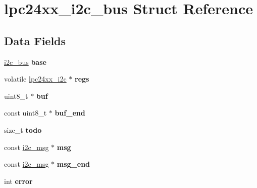 \hypertarget{structlpc24xx__i2c__bus}{}\section{lpc24xx\+\_\+i2c\+\_\+bus Struct Reference}
\label{structlpc24xx__i2c__bus}
\subsection*{Data Fields}
\begin{DoxyCompactItemize}
\item 
\mbox{\label{structlpc24xx__i2c__bus_a139849d39558f32d1b53237c713c8ab4}} 
\mbox{\hyperlink{structi2c__bus}{i2c\+\_\+bus}} {\bfseries base}
\item 
\mbox{\label{structlpc24xx__i2c__bus_ada95c5e5f8e62ea88c36ff27f76bedbc}} 
volatile \mbox{\hyperlink{structlpc24xx__i2c}{lpc24xx\+\_\+i2c}} $\ast$ {\bfseries regs}
\item 
\mbox{\label{structlpc24xx__i2c__bus_adae348b7c33baf8a77671d7409d926f5}} 
uint8\+\_\+t $\ast$ {\bfseries buf}
\item 
\mbox{\label{structlpc24xx__i2c__bus_aeb45789c9ac8c9061e08d386bfd4b80a}} 
const uint8\+\_\+t $\ast$ {\bfseries buf\+\_\+end}
\item 
\mbox{\label{structlpc24xx__i2c__bus_ad21870c0e0f94593d7ce922b96b28f83}} 
size\+\_\+t {\bfseries todo}
\item 
\mbox{\label{structlpc24xx__i2c__bus_a6d53b7d9d830b713f5756e5bbc599c5f}} 
const \mbox{\hyperlink{structi2c__msg}{i2c\+\_\+msg}} $\ast$ {\bfseries msg}
\item 
\mbox{\label{structlpc24xx__i2c__bus_a33839e7c730d0456724ef6a034b73ab5}} 
const \mbox{\hyperlink{structi2c__msg}{i2c\+\_\+msg}} $\ast$ {\bfseries msg\+\_\+end}
\item 
\mbox{\label{structlpc24xx__i2c__bus_a626d7ab61f3c95bcf31312681f112985}} 
int {\bfseries error}
\item 

\end{DoxyCompactItemize}
